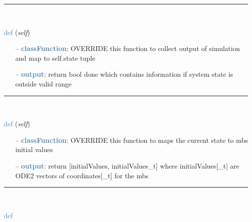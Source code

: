 \begin{itemize}[leftmargin=1.4cm]
\begin{itemize}[leftmargin=0.7cm]
\vspace{12pt}\end{itemize}
%
\noindent\rule{8cm}{0.75pt}\vspace{1pt} \\ 
\begin{flushleft}
\noindent \textcolor{steelblue}{def {\bf {}}}\label{sec:artificialIntelligence:OpenAIGymInterfaceEnv:Output2StateAndDone}
({\it self})
\end{flushleft}
\setlength{\itemindent}{0.7cm}
\begin{itemize}[leftmargin=0.7cm]
\item[--]\textcolor{steelblue}{\bf classFunction}: OVERRIDE this function to collect output of simulation and map to self.state tuple
\item[--]\textcolor{steelblue}{\bf output}: return bool done which contains information if system state is outside valid range
\vspace{12pt}\end{itemize}
%
\noindent\rule{8cm}{0.75pt}\vspace{1pt} \\ 
\begin{flushleft}
\noindent \textcolor{steelblue}{def {\bf {}}}\label{sec:artificialIntelligence:OpenAIGymInterfaceEnv:State2InitialValues}
({\it self})
\end{flushleft}
\setlength{\itemindent}{0.7cm}
\begin{itemize}[leftmargin=0.7cm]
\item[--]\textcolor{steelblue}{\bf classFunction}: OVERRIDE this function to maps the current state to mbs initial values
\item[--]\textcolor{steelblue}{\bf output}: return [initialValues, initialValues\_t] where initialValues[\_t] are ODE2 vectors of coordinates[\_t] for the mbs
\vspace{12pt}\end{itemize}
%
\noindent\rule{8cm}{0.75pt}\vspace{1pt} \\ 
\begin{flushleft}
\noindent \textcolor{steelblue}{def {\bf {}}}\label{sec:artificialIntelligence:OpenAIGymInterfaceEnv:TestModel}

\end{flushleft}
\end{itemize}
